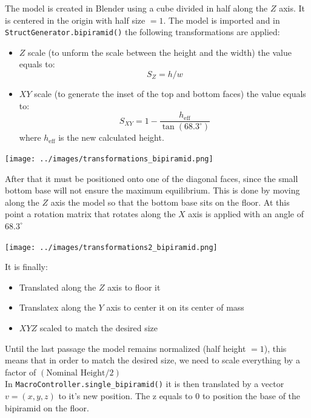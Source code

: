 \documentclass{article}
\begin{document}
The model is created in Blender using a cube divided in half along the $Z$ axis. It is centered in the origin with half size $=1$.
The model is imported and in \texttt{StructGenerator.bipiramid()} the following transformations are applied:
\begin{itemize}
    \item $Z$ scale (to unform the scale between the height and the width) the value equals to: $$S_Z = h / w$$
    \item $XY$ scale (to generate the inset of the top and bottom faces) the value equals to: $$S_{XY} = 1 - \frac{h_\text{eff}}{\tan(68.3^{\circ})}$$ where $h_\text{eff}$ is the new calculated height.
\end{itemize}
\begin{center}
    \texttt{[image: ../images/transformations\_bipiramid.png]}
\end{center}
After that it must be positioned onto one of the diagonal faces, since the small bottom base will not ensure the maximum equilibrium. This is done by moving along the $Z$ axis the model so that the bottom base sits on the floor. At this point a rotation matrix that rotates along the $X$ axis is applied with an angle of $68.3^{\circ}$
\begin{center}
    \texttt{[image: ../images/transformations2\_bipiramid.png]}
\end{center}
It is finally:
\begin{itemize}
    \item Translated along the $Z$ axis to floor it 
    \item Translatex along the $Y$ axis to center it on its center of mass
    \item $XYZ$ scaled to match the desired size 
\end{itemize}
Until the last passage the model remains normalized (half height $=1$), this means that in order to match the desired size, we need to scale everything by a factor of $(\text{Nominal Height} / 2)$
\\[.5cm]
In \texttt{MacroController.single\_bipiramid()} it is then translated by a vector $v = (x, y, z)$ to it's new position. The z equals to $0$ to position the base of the bipiramid on the floor.
\end{document}
